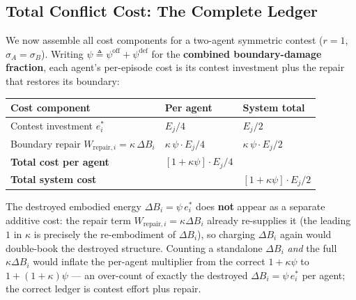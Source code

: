 \documentclass[11pt]{article}
\theoremstyle{plain}
\theoremstyle{definition}
\theoremstyle{remark}
\newcounter{none}
\let\origsubsection\subsection
\renewcommand{\subsection}{\needspace{7\baselineskip}\origsubsection}
\begin{document}
\subsection{Total Conflict Cost: The Complete
Ledger}\label{total-conflict-cost-the-complete-ledger}

We now assemble all cost components for a two-agent symmetric contest
(\(r = 1\), \(\sigma_A = \sigma_B\)). Writing
\(\psi \triangleq \psi^{\text{off}} + \psi^{\text{def}}\) for the
\textbf{combined boundary-damage fraction}, each agent's per-episode
cost is its contest investment plus the repair that restores its
boundary:

{\def\LTcaptype{none} %
\begin{longtable}[]{@{}
  >{\raggedright\arraybackslash}p{}
  >{\raggedright\arraybackslash}p{}
  >{\raggedright\arraybackslash}p{}@{}}
\toprule\noalign{}
\begin{minipage}[b]{\linewidth}\raggedright
Cost component
\end{minipage} & \begin{minipage}[b]{\linewidth}\raggedright
Per agent
\end{minipage} & \begin{minipage}[b]{\linewidth}\raggedright
System total
\end{minipage} \\
\midrule\noalign{}
\endhead
\bottomrule\noalign{}
\endlastfoot
Contest investment \(e_i^*\) & \(E_j / 4\) & \(E_j / 2\) \\
Boundary repair \(W_{\text{repair},i} = \kappa \, \Delta B_i\) &
\(\kappa \, \psi \cdot E_j / 4\) & \(\kappa \, \psi \cdot E_j / 2\) \\
\textbf{Total cost per agent} & \([1 + \kappa \psi] \cdot E_j / 4\) & \\
\textbf{Total system cost} & & \([1 + \kappa \psi] \cdot E_j/2\) \\
\end{longtable}
}

The destroyed embodied energy \(\Delta B_i = \psi \, e_i^*\) does
\textbf{not} appear as a separate additive cost: the repair term
\(W_{\text{repair},i} = \kappa \Delta B_i\) already re-supplies it (the
leading \(1\) in \(\kappa\) is precisely the re-embodiment of
\(\Delta B_i\)), so charging \(\Delta B_i\) again would double-book the
destroyed structure. Counting a standalone \(\Delta B_i\) \emph{and} the
full \(\kappa \Delta B_i\) would inflate the per-agent multiplier from
the correct \(1+\kappa\psi\) to \(1 + (1+\kappa)\psi\) --- an over-count
of exactly the destroyed \(\Delta B_i = \psi\, e_i^*\) per agent; the
correct ledger is contest effort plus repair.
\end{document}
